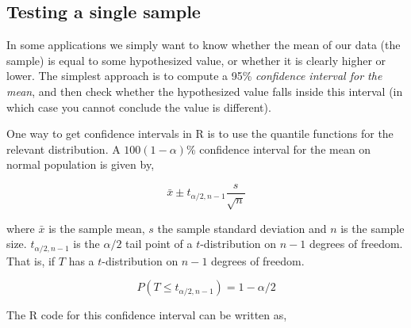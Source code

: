 \documentclass[]{book}
\newenvironment{Shaded}{\begin{snugshade}}{\end{snugshade}}
\newcommand{\CommentTok}[1]{\textcolor[rgb]{0.56,0.35,0.01}{\textit{#1}}}
\newcommand{\DecValTok}[1]{\textcolor[rgb]{0.00,0.00,0.81}{#1}}
\newcommand{\FloatTok}[1]{\textcolor[rgb]{0.00,0.00,0.81}{#1}}
\newcommand{\KeywordTok}[1]{\textcolor[rgb]{0.13,0.29,0.53}{\textbf{#1}}}
\newcommand{\NormalTok}[1]{#1}
\newcommand{\OperatorTok}[1]{\textcolor[rgb]{0.81,0.36,0.00}{\textbf{#1}}}
\newcommand{\StringTok}[1]{\textcolor[rgb]{0.31,0.60,0.02}{#1}}
\begin{document}
\hypertarget{singlesample}{%
\subsection{Testing a single sample}\label{singlesample}}

In some applications we simply want to know whether the mean of our data (the sample) is equal to some hypothesized value, or whether it is clearly higher or lower. The simplest approach is to compute a 95\% \emph{confidence interval for the mean}, and then check whether the hypothesized value falls inside this interval (in which case you cannot conclude the value is different).

One way to get confidence intervals in R is to use the quantile functions for the relevant distribution. A \(100(1-\alpha)\)\% confidence interval for the mean on normal population is given by,

\[\bar{x} \pm t_{\alpha/2, n-1} \frac{s}{\sqrt{n}}\]

where \(\bar{x}\) is the sample mean, \(s\) the sample standard deviation and \(n\) is the sample size. \(t_{\alpha/2, n-1}\) is the \(\alpha/2\) tail point of a \(t\)-distribution on \(n-1\) degrees of freedom. That is, if \(T\) has a \(t\)-distribution on \(n-1\) degrees of freedom.

\[P(T \leq t_{\alpha/2, n-1}) = 1-\alpha/2 \]

The R code for this confidence interval can be written as,

\begin{Shaded}
\end{Shaded}
\end{document}
